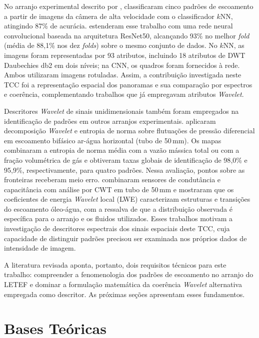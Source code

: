 No arranjo experimental descrito por , 
classificaram cinco padrões de escoamento a partir de imagens da câmera de alta velocidade
com o classificador $k$NN, atingindo 87\% de acurácia.  estenderam
esse trabalho com uma rede neural convolucional baseada na arquitetura ResNet50, alcançando
93\% no melhor \textit{fold} (média de 88{,}1\% nos dez \textit{folds}) sobre o mesmo conjunto 
de dados. No $k$NN, as imagens foram representadas por 93 atributos, incluindo
18 atributos de DWT Daubechies db2 em dois níveis; na CNN, os quadros foram
fornecidos à rede. Ambos utilizaram imagens rotuladas. Assim, a contribuição
investigada neste TCC foi a representação espacial dos panoramas e sua comparação
por espectros e coerência, complementando trabalhos que já empregavam
atributos \textit{Wavelet}.

Descritores \textit{Wavelet} de sinais unidimensionais também foram empregados
na identificação de padrões em outros arranjos experimentais.
 aplicaram
decomposição \textit{Wavelet} e entropia de norma sobre flutuações de pressão diferencial
em escoamento bifásico ar-água horizontal (tubo de 50\,mm). Os mapas combinaram
a entropia de norma média com a vazão mássica total ou com a fração volumétrica
de gás e obtiveram taxas globais de identificação de 98{,}0\% e 95{,}9\%,
respectivamente, para quatro padrões. Nessa avaliação, pontos sobre as fronteiras
receberam meio erro.  combinaram sensores de condutância e
capacitância com análise por CWT em tubo de 50\,mm e mostraram que os coeficientes de
energia \textit{Wavelet} local (LWE) caracterizam estruturas e transições do escoamento óleo-água, com a
ressalva de que a distribuição observada é específica para o arranjo e os fluidos
utilizados. Esses trabalhos motivam a investigação de descritores espectrais
dos sinais espaciais deste TCC, cuja capacidade de distinguir padrões precisou
ser examinada nos próprios dados de intensidade de imagem.

A literatura revisada aponta, portanto, dois requisitos técnicos para este trabalho:
compreender a fenomenologia dos padrões de escoamento no arranjo do LETEF e dominar
a formulação matemática da coerência \textit{Wavelet} alternativa empregada
como descritor. As próximas seções apresentam esses fundamentos.

\section{Bases Teóricas}\label{sec:bases}

